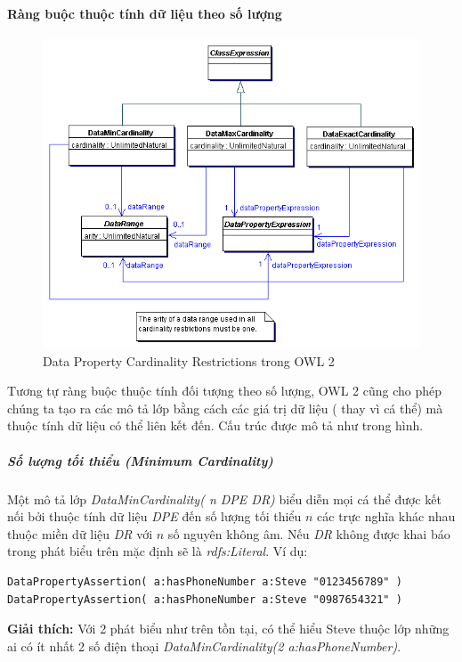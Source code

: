 \paragraph{Ràng buộc thuộc tính dữ liệu theo số lượng}
\begin{figure}[h]
	\centering
	\includegraphics[width=150mm]{Figures/ce_4.png}
	\caption{Data Property Cardinality Restrictions trong OWL 2\label{overflow}}
\end{figure}
Tương tự ràng buộc thuộc tính đối tượng theo số lượng, OWL 2 cũng cho phép chúng ta tạo ra các mô tả lớp bằng cách các giá trị dữ liệu ( thay vì cá thể) mà thuộc tính dữ liệu có thể liên kết đến. Cấu trúc được mô tả như trong hình.

\subparagraph{Số lượng tối thiểu (Minimum Cardinality)} Một mô tả lớp \textit{DataMinCardinality( n DPE DR)}  biểu diễn mọi cá thể được kết nối bởi thuộc tính dữ liệu \textit{DPE} đến số lượng tối thiểu $n$ các trực nghĩa khác nhau thuộc miền dữ liệu  \textit{DR} với $n$ số nguyên không âm. Nếu \textit{DR} không được khai báo trong phát biểu trên mặc định sẽ là \textit{rdfs:Literal}. Ví dụ:
\begin{verbatim}
DataPropertyAssertion( a:hasPhoneNumber a:Steve "0123456789" )
DataPropertyAssertion( a:hasPhoneNumber a:Steve "0987654321" )
\end{verbatim}
\textbf{Giải thích:} Với 2 phát biểu như trên tồn tại, có thể hiểu Steve thuộc lớp những ai có ít nhất 2 số điện thoại \textit{DataMinCardinality(2 a:hasPhoneNumber)}.


